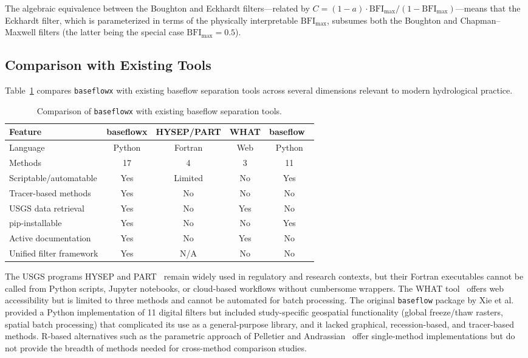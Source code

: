 \documentclass[hydrology,article,submit,pdftex,moreauthors]{Definitions/mdpi}
\begin{document}
The algebraic equivalence between the Boughton and Eckhardt filters---related by $C = (1-a)\cdot\mathrm{BFI_{max}}/(1-\mathrm{BFI_{max}})$---means that the Eckhardt filter, which is parameterized in terms of the physically interpretable $\mathrm{BFI_{max}}$, subsumes both the Boughton and Chapman--Maxwell filters (the latter being the special case $\mathrm{BFI_{max}} = 0.5$).

\subsection{Comparison with Existing Tools}
\label{sec:comparison_tools}

Table~\ref{tab:comparison} compares \texttt{baseflowx} with existing baseflow separation tools across several dimensions relevant to modern hydrological practice.

\begin{table}[H]
\caption{Comparison of \texttt{baseflowx} with existing baseflow separation tools.\label{tab:comparison}}
\small
\begin{tabularx}{\textwidth}{lcccc}
\toprule
\textbf{Feature} & \textbf{baseflowx} & \textbf{HYSEP/PART} & \textbf{WHAT} & \textbf{baseflow}~\cite{Xie2020} \\
\midrule
Language & Python & Fortran & Web & Python \\
Methods & 17 & 4 & 3 & 11 \\
Scriptable/automatable & Yes & Limited & No & Yes \\
Tracer-based methods & Yes & No & No & No \\
USGS data retrieval & Yes & No & Yes & No \\
pip-installable & Yes & No & No & Yes \\
Active documentation & Yes & No & Yes & No \\
Unified filter framework & Yes & N/A & No & No \\
\bottomrule
\end{tabularx}
\end{table}

The USGS programs HYSEP and PART~\cite{Sloto1996,Rutledge1998} remain widely used in regulatory and research contexts, but their Fortran executables cannot be called from Python scripts, Jupyter notebooks, or cloud-based workflows without cumbersome wrappers. The WHAT tool~\cite{Lim2005} offers web accessibility but is limited to three methods and cannot be automated for batch processing. The original \texttt{baseflow} package by Xie et al.~\cite{Xie2020} provided a Python implementation of 11 digital filters but included study-specific geospatial functionality (global freeze/thaw rasters, spatial batch processing) that complicated its use as a general-purpose library, and it lacked graphical, recession-based, and tracer-based methods. R-based alternatives such as the parametric approach of Pelletier and Andrassian~\cite{Pelletier2020} offer single-method implementations but do not provide the breadth of methods needed for cross-method comparison studies.
\end{document}
